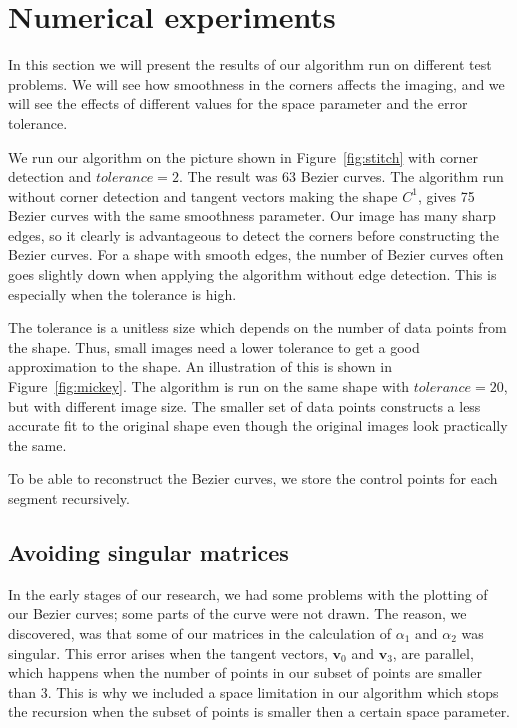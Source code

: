 \documentclass[10pt]{article}
\begin{document}
\section{Numerical experiments}

In this section we will present the results of our algorithm run on different test problems. We will see how smoothness in the corners affects the imaging, and we will see the effects of different values for the space parameter and the error tolerance.


We run our algorithm on the picture shown in Figure~\ref{fig:stitch} with corner detection and $tolerance = 2$. The result was 63 Bezier curves. The algorithm run without corner detection and tangent vectors making the shape $C^1$, gives 75 Bezier curves with the same smoothness parameter. Our image has many sharp edges, so it clearly is advantageous to detect the corners before constructing the Bezier curves. For a shape with smooth edges, the number of Bezier curves often goes slightly down when applying the algorithm without edge detection. This is especially when the tolerance is high.  

The tolerance is a unitless size which depends on the number of data points from the shape. Thus, small images need a lower tolerance to get a good approximation to the shape.  An illustration of this is shown in Figure~\ref{fig:mickey}. The algorithm is run on the same shape with $tolerance = 20$, but with different image size. The smaller set of data points constructs a less accurate fit to the original shape even though the original images look practically the same. 

To be able to reconstruct the Bezier curves, we store the control points for each segment recursively.


\subsection*{Avoiding singular matrices}
In the early stages of our research, we had some problems with the plotting of our Bezier curves; some parts of the curve were not drawn. The reason, we discovered, was that some of our matrices in the calculation of $\alpha_1$ and $\alpha_2$ was singular. This error arises when the tangent vectors, $\mathbf{v}_0$ and $\mathbf{v}_3$, are parallel, which happens when the number of points in our subset of points are smaller than 3. This is why we included a space limitation in our algorithm which stops the recursion when the subset of points is smaller then a certain space parameter.
\end{document}
